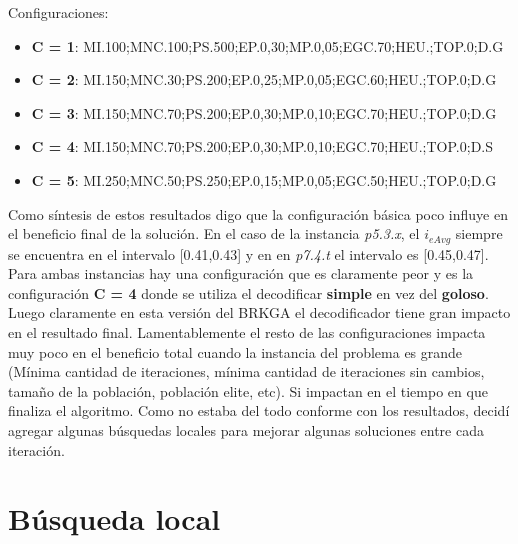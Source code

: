 \bigskip

Configuraciones: 
\begin{itemize}
  \item \textbf{C = 1}: MI.100;MNC.100;PS.500;EP.0,30;MP.0,05;EGC.70;HEU.;TOP.0;D.G
  \item \textbf{C = 2}: MI.150;MNC.30;PS.200;EP.0,25;MP.0,05;EGC.60;HEU.;TOP.0;D.G 
  \item \textbf{C = 3}: MI.150;MNC.70;PS.200;EP.0,30;MP.0,10;EGC.70;HEU.;TOP.0;D.G
  \item \textbf{C = 4}: MI.150;MNC.70;PS.200;EP.0,30;MP.0,10;EGC.70;HEU.;TOP.0;D.S
  \item \textbf{C = 5}: MI.250;MNC.50;PS.250;EP.0,15;MP.0,05;EGC.50;HEU.;TOP.0;D.G 
\end{itemize}

\bigskip

Como síntesis de estos resultados digo que la configuración básica poco influye en el beneficio final de la solución. En el caso de la instancia \textit{p5.3.x}, el $i_{eAvg}$ siempre se encuentra en el intervalo [0.41,0.43] y en en \textit{p7.4.t} el intervalo es [0.45,0.47]. Para ambas instancias hay una configuración que es claramente peor y es la configuración \textbf{C = 4} donde se utiliza el decodificar \textbf{simple} en vez del \textbf{goloso}. Luego claramente en esta versión del BRKGA el decodificador tiene gran impacto en el resultado final. Lamentablemente el resto de las configuraciones impacta muy poco en el beneficio total cuando la instancia del problema es grande (Mínima cantidad de iteraciones, mínima cantidad de iteraciones sin cambios, tamaño de la población, población elite, etc). Si impactan en el tiempo en que finaliza el algoritmo. Como no estaba del todo conforme con los resultados, decidí agregar algunas búsquedas locales para mejorar algunas soluciones entre cada iteración.

\bigskip

\section{Búsqueda local}

